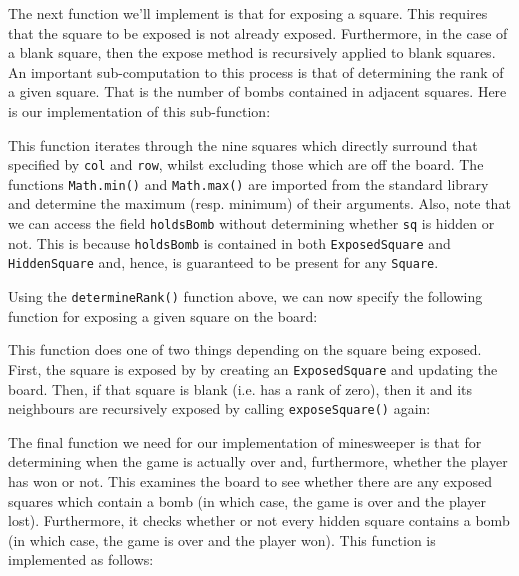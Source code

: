 The next function we'll implement is that for exposing a square.  This requires that the square to be exposed is not already exposed.  Furthermore, in the case of a blank square, then the expose method is recursively applied to blank squares.  An important sub-computation to this process is that of determining the rank of a given square.  That is the number of bombs contained in adjacent squares.  Here is our implementation of this sub-function:



This function iterates through the nine squares which directly surround that specified by \lstinline{col} and \lstinline{row}, whilst excluding those which are off the board.  The functions \lstinline{Math.min()} and \lstinline{Math.max()} are imported from the standard library and determine the maximum (resp. minimum) of their arguments.  Also, note that we can access the field \lstinline{holdsBomb} without determining whether \lstinline{sq} is hidden or not.  This is because \lstinline{holdsBomb} is contained in both \lstinline{ExposedSquare} and \lstinline{HiddenSquare} and, hence, is guaranteed to be present for any \lstinline{Square}.

Using the \lstinline{determineRank()} function above, we can now specify the following function for exposing a given square on the board:



This function does one of two things depending on the square being exposed.  First, the square is exposed by by creating an \lstinline{ExposedSquare} and updating the board.  Then, if that square is blank (i.e. has a rank of zero), then it and its neighbours are recursively exposed by calling \lstinline{exposeSquare()} again:



The final function we need for our implementation of minesweeper is that for determining when the game is actually over and, furthermore, whether the player has won or not.  This examines the board to see whether there are any exposed squares which contain a bomb (in which case, the game is over and the player lost).  Furthermore, it checks whether or not every hidden square contains a bomb (in which case, the game is over and the player won).  This function is implemented as follows:

